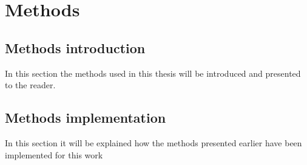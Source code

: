 \chapter*{Methods}
\section*{Methods introduction}
In this section the methods used in this thesis will be introduced and presented to the reader. 


\section*{Methods implementation}
In this section it will be explained how the methods presented earlier have been implemented for this work